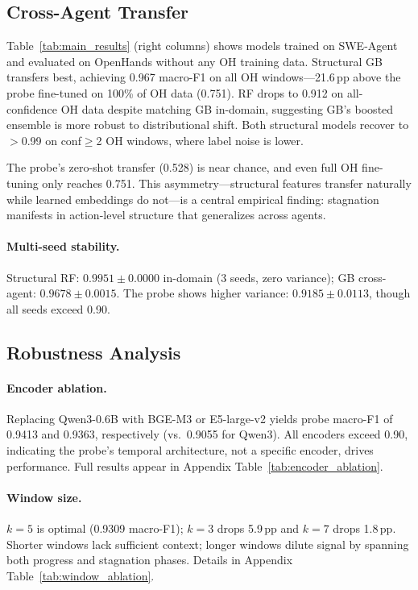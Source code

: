 \subsection{Cross-Agent Transfer}
\label{sec:cross_agent}

Table~\ref{tab:main_results} (right columns) shows models trained on SWE-Agent and evaluated on OpenHands without any OH training data.
Structural GB transfers best, achieving 0.967 macro-F1 on all OH windows---21.6\,pp above the probe fine-tuned on 100\% of OH data (0.751).
RF drops to 0.912 on all-confidence OH data despite matching GB in-domain, suggesting GB's boosted ensemble is more robust to distributional shift.
Both structural models recover to $>$0.99 on conf${\geq}$2 OH windows, where label noise is lower.

The probe's zero-shot transfer (0.528) is near chance, and even full OH fine-tuning only reaches 0.751.
This asymmetry---structural features transfer naturally while learned embeddings do not---is a central empirical finding: stagnation manifests in action-level structure that generalizes across agents.

\paragraph{Multi-seed stability.}
Structural RF: $0.9951{\pm}0.0000$ in-domain (3 seeds, zero variance); GB cross-agent: $0.9678{\pm}0.0015$.
The probe shows higher variance: $0.9185{\pm}0.0113$, though all seeds exceed 0.90.

\subsection{Robustness Analysis}
\label{sec:robustness}

\paragraph{Encoder ablation.}
Replacing Qwen3-0.6B with BGE-M3 \citep{chen2024bgem3} or E5-large-v2 \citep{wang2024e5} yields probe macro-F1 of 0.9413 and 0.9363, respectively (vs.\ 0.9055 for Qwen3).
All encoders exceed 0.90, indicating the probe's temporal architecture, not a specific encoder, drives performance. Full results appear in Appendix Table~\ref{tab:encoder_ablation}.

\paragraph{Window size.}
$k{=}5$ is optimal (0.9309 macro-F1); $k{=}3$ drops 5.9\,pp and $k{=}7$ drops 1.8\,pp.
Shorter windows lack sufficient context; longer windows dilute signal by spanning both progress and stagnation phases.
Details in Appendix Table~\ref{tab:window_ablation}.

